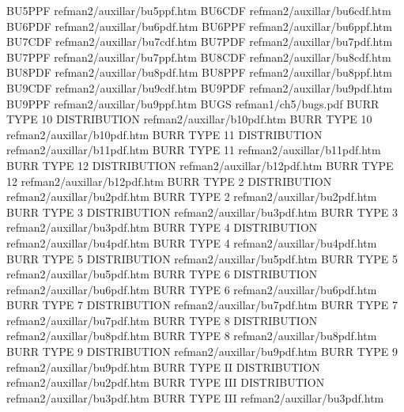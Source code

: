 BU5PPF                                  refman2/auxillar/bu5ppf.htm
BU6CDF                                  refman2/auxillar/bu6cdf.htm
BU6PDF                                  refman2/auxillar/bu6pdf.htm
BU6PPF                                  refman2/auxillar/bu6ppf.htm
BU7CDF                                  refman2/auxillar/bu7cdf.htm
BU7PDF                                  refman2/auxillar/bu7pdf.htm
BU7PPF                                  refman2/auxillar/bu7ppf.htm
BU8CDF                                  refman2/auxillar/bu8cdf.htm
BU8PDF                                  refman2/auxillar/bu8pdf.htm
BU8PPF                                  refman2/auxillar/bu8ppf.htm
BU9CDF                                  refman2/auxillar/bu9cdf.htm
BU9PDF                                  refman2/auxillar/bu9pdf.htm
BU9PPF                                  refman2/auxillar/bu9ppf.htm
BUGS                                    refman1/ch5/bugs.pdf
BURR TYPE 10 DISTRIBUTION               refman2/auxillar/b10pdf.htm
BURR TYPE 10                            refman2/auxillar/b10pdf.htm
BURR TYPE 11 DISTRIBUTION               refman2/auxillar/b11pdf.htm
BURR TYPE 11                            refman2/auxillar/b11pdf.htm
BURR TYPE 12 DISTRIBUTION               refman2/auxillar/b12pdf.htm
BURR TYPE 12                            refman2/auxillar/b12pdf.htm
BURR TYPE 2 DISTRIBUTION                refman2/auxillar/bu2pdf.htm
BURR TYPE 2                             refman2/auxillar/bu2pdf.htm
BURR TYPE 3 DISTRIBUTION                refman2/auxillar/bu3pdf.htm
BURR TYPE 3                             refman2/auxillar/bu3pdf.htm
BURR TYPE 4 DISTRIBUTION                refman2/auxillar/bu4pdf.htm
BURR TYPE 4                             refman2/auxillar/bu4pdf.htm
BURR TYPE 5 DISTRIBUTION                refman2/auxillar/bu5pdf.htm
BURR TYPE 5                             refman2/auxillar/bu5pdf.htm
BURR TYPE 6 DISTRIBUTION                refman2/auxillar/bu6pdf.htm
BURR TYPE 6                             refman2/auxillar/bu6pdf.htm
BURR TYPE 7 DISTRIBUTION                refman2/auxillar/bu7pdf.htm
BURR TYPE 7                             refman2/auxillar/bu7pdf.htm
BURR TYPE 8 DISTRIBUTION                refman2/auxillar/bu8pdf.htm
BURR TYPE 8                             refman2/auxillar/bu8pdf.htm
BURR TYPE 9 DISTRIBUTION                refman2/auxillar/bu9pdf.htm
BURR TYPE 9                             refman2/auxillar/bu9pdf.htm
BURR TYPE II DISTRIBUTION               refman2/auxillar/bu2pdf.htm
BURR TYPE III DISTRIBUTION              refman2/auxillar/bu3pdf.htm
BURR TYPE III                           refman2/auxillar/bu3pdf.htm
